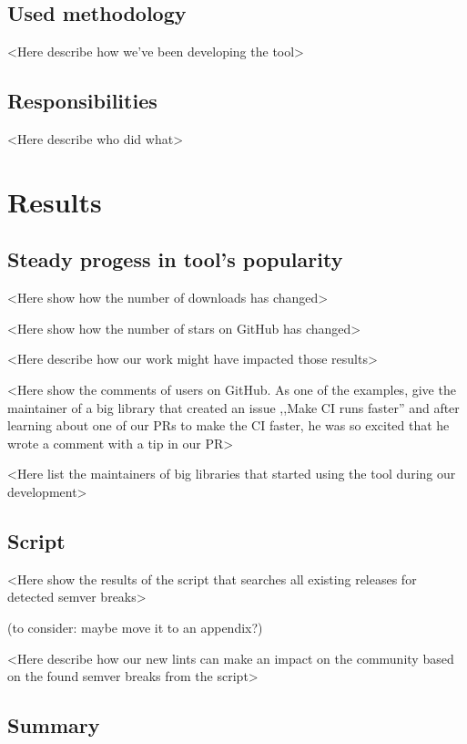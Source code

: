 \documentclass[licencjacka,en]{pracamgr}
\begin{document}
\section{Used methodology}

<Here describe how we've been developing the tool>

\section{Responsibilities}

<Here describe who did what>

\chapter{Results}

\section{Steady progess in tool's popularity}

<Here show how the number of downloads has changed>

<Here show how the number of stars on GitHub has changed>

<Here describe how our work might have impacted those results>

<Here show the comments of users on GitHub.
As one of the examples, give the maintainer of a big
library that created an issue ,,Make CI runs faster''
and after learning about one of our PRs to make the CI faster,
he was so excited that he wrote a comment with a tip in our PR>

<Here list the maintainers of big libraries that started using the tool during our development>

\section{Script}

<Here show the results of the script that searches all existing releases for detected semver breaks>

(to consider: maybe move it to an appendix?)

<Here describe how our new lints can make an impact on the community based on the found semver breaks from the script>

\section{Summary}
\end{document}
